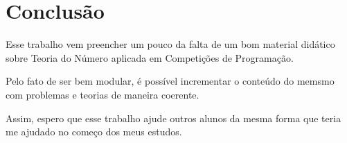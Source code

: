 
\chapter{Conclusão} %

\label{Chapter5} %


Esse trabalho vem preencher um pouco da falta de um bom material didático sobre Teoria do Número aplicada em Competições de Programação.

Pelo fato de ser bem modular, é possível incrementar o conteúdo do memsmo com problemas e teorias de maneira coerente.

Assim, espero que esse trabalho ajude outros alunos da mesma forma que teria me ajudado no começo dos meus estudos. 
